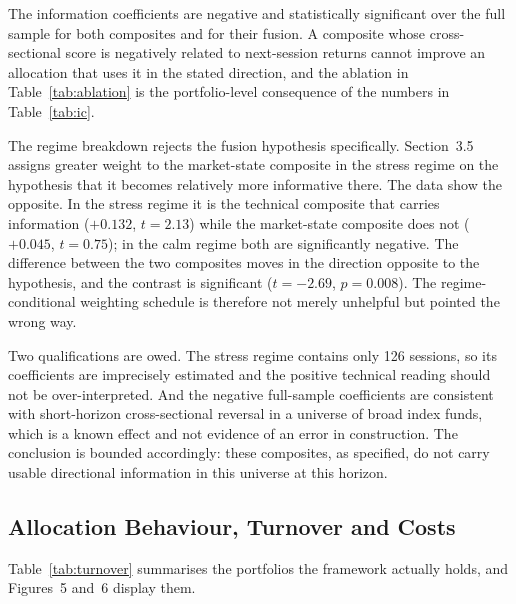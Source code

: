 \documentclass{singlecol-new}
\theoremstyle{TH}{
\newtheorem{lemma}{Lemma}
\newtheorem{theorem}[lemma]{Theorem}
\newtheorem{corrolary}[lemma]{Corrolary}
\newtheorem{conjecture}[lemma]{Conjecture}
\newtheorem{proposition}[lemma]{Proposition}
\newtheorem{claim}[lemma]{Claim}
\newtheorem{stheorem}[lemma]{Wrong Theorem}
\newtheorem{algorithm}{Algorithm}
}
\theoremstyle{THrm}{
\newtheorem{definition}{Definition}[section]
\newtheorem{question}{Question}[section]
\newtheorem{remark}{Remark}
\newtheorem{scheme}{Scheme}
}
\theoremstyle{THhit}{
\newtheorem{case}{Case}[section]
}
\begin{document}
The information coefficients are negative and statistically significant over the full
sample for both composites and for their fusion. A composite whose cross-sectional
score is negatively related to next-session returns cannot improve an allocation that
uses it in the stated direction, and the ablation in Table~\ref{tab:ablation} is the portfolio-level
consequence of the numbers in Table~\ref{tab:ic}.

The regime breakdown rejects the fusion hypothesis specifically. Section~3.5 assigns
greater weight to the market-state composite in the stress regime on the hypothesis
that it becomes relatively more informative there. The data show the opposite. In the
stress regime it is the technical composite that carries information ($+0.132$,
$t = 2.13$) while the market-state composite does not ($+0.045$, $t = 0.75$); in the
calm regime both are significantly negative. The difference between the two composites
moves in the direction opposite to the hypothesis, and the contrast is significant
($t = -2.69$, $p = 0.008$). The regime-conditional weighting schedule is therefore not
merely unhelpful but pointed the wrong way.

Two qualifications are owed. The stress regime contains only 126 sessions, so its
coefficients are imprecisely estimated and the positive technical reading should not be
over-interpreted. And the negative full-sample coefficients are consistent with
short-horizon cross-sectional reversal in a universe of broad index funds, which is a
known effect and not evidence of an error in construction. The conclusion is bounded
accordingly: these composites, as specified, do not carry usable directional
information in this universe at this horizon.

\subsection{Allocation Behaviour, Turnover and Costs}
\label{sec:alloc}
\label{sec:cost}

Table~\ref{tab:turnover} summarises the portfolios the framework actually holds, and Figures~5 and~6
display them.
\end{document}
